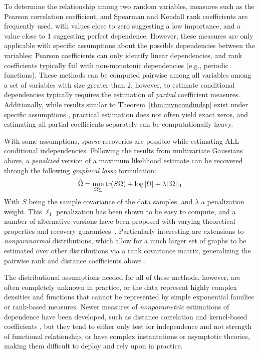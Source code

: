 To determine the relationship among two random variables, measures such as the Pearson correlation coefficient, and Spearman and Kendall rank coefficients \citep{myers2013research} are frequently used, with values close to zero suggesting a low importance, and a value close to 1 suggesting perfect dependence. However,
these measures are only applicable with specific assumptions about the possible dependencies between the variables: Pearson coefficients can only identify linear dependencies, and rank coefficients typically fail with non-monotonic dependencies (e.g., periodic functions). These methods can be computed pairwise among all variables among a set of variables with size greater than 2, however, to estimate conditional dependencies typically requires the estimation of \textit{partial} coefficient measures.
Additionally, while results similar to Theorem~\ref{thm:mvncondindep} exist under specific assumptions ,
practical estimation does not often yield exact zeros,
and estimating all partial coefficients separately can be computationally heavy.

With some assumptions, \textit{sparse} recoveries are possible while estimating ALL conditional independencies. Following the results from multivariate Gaussians above,
a \textit{penalized} version of a maximum likelihood estimate can be recovered through the following \textit{graphical lasso} \cite{friedman2008sparse} formulation:
\begin{align}\label{eq:glasso}
    \hat{\Omega} = \min_{\Omega \succeq} \operatorname{tr}(S\Omega) + \log|\Omega| + \lambda||\Omega||_1
\end{align}
With $S$ being the sample covariance of the data samples, and $\lambda$ a penalization weight. This $\ell_1$ penalization has been shown to be easy to compute, and a number of alternative versions have been proposed with varying theoretical properties and recovery guarantees~\citep{cai2011constrained,yuan2010high}.
Particularly interesting are extensions to \textit{nonparanormal} distributions, which allow for a much larger set of graphs to be estimated over other distributions via a rank covariance matrix, generalizing the pairwise rank and distance coefficients above \cite{liu2009nonparanormal,xue2012regularized}.

The distributional assumptions needed for all of these methods, however, are often completely unknown in practice, or the data represent highly complex densities and functions that cannot be represented by simple exponential families or rank-based measures.
Newer measures of \textit{nonparametric} estimations of dependence have been developed, such as distance correlation and kernel-based coefficients \cite{abc}, but they tend to either only test for independence and not strength of functional relationship, or have complex instantations or asymptotic theories, making them difficult to deploy and rely upon in practice.

